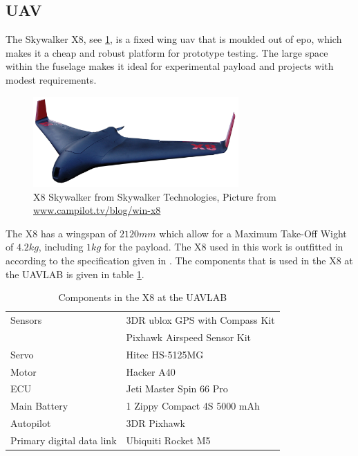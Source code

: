 \subsection{UAV}\label{ss:SkywalkerX8}
The Skywalker X8, see \ref{figure:skywalkerX8}, is a fixed wing \gls{uav} that is moulded out of \gls{epo}, which makes it a cheap and robust platform for prototype testing. The large space within the fuselage makes it ideal for experimental payload and projects with modest requirements.
\begin{figure}[H]
	\centering
		\includegraphics[width=0.7\textwidth]{figs/Wing-X8_white-bgd2.png}
		\caption{X8 Skywalker from Skywalker Technologies, Picture from \url{www.campilot.tv/blog/win-x8}}
		\label{figure:skywalkerX8}
\end{figure}
The X8 has a wingspan of $2120mm$ which allow for a Maximum Take-Off Wight of $4.2kg$, including $1kg$ for the payload. The X8 used in this work is outfitted in according to the specification given in \citep{KlausenX8}. The components that is used in the X8 at the UAVLAB is given in table \ref{tb:X8Components}.
\begin{table}[H]
\begin{center}
\begin{tabular}{l l}
Sensors & 3DR ublox GPS with Compass Kit\\&Pixhawk Airspeed Sensor Kit \\
Servo & Hitec HS-5125MG \\
Motor & Hacker A40 \\
ECU & Jeti Master Spin 66 Pro \\
Main Battery & 1 Zippy Compact 4S 5000 mAh\\
Autopilot & 3DR Pixhawk \\
Primary digital data link & Ubiquiti Rocket M5
\end{tabular}
\end{center}
\caption{Components in the X8 at the UAVLAB}
\label{tb:X8Components}
\end{table}
